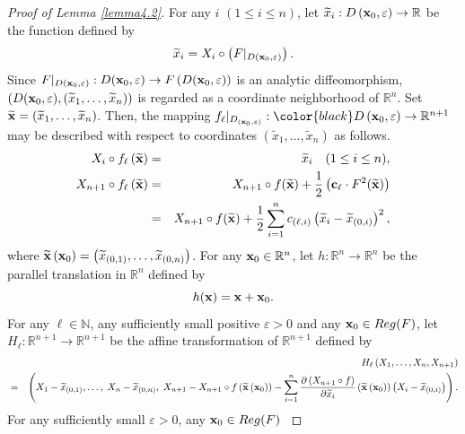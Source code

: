 \documentclass{amsart}
\theoremstyle{definition}
\theoremstyle{definition}
\theoremstyle{definition}
\newcommand{\ch}[1]{{\color{black} #1}}
\begin{document}
{{\begin{proof}[Proof of Lemma \ref{lemma4.2}]
{For any $i$ $(1\le i\le n)$, let 
$\widetilde{x}_i: D\left({\bf x}_0, \varepsilon\right)\to \mathbb{R}$ 
be the function 
defined by 
\[
\widetilde{x}_i=X_i\circ 
\left(F|_{D\left({\bf x}_0, \varepsilon\right)}\right).   
\] 
Since $F|_{D({\bf x}_0, \varepsilon)}: 
D({\bf x}_0, \varepsilon)
\to F\left(D({\bf x}_0, \varepsilon)\right)$ 
is an analytic diffeomorphism, 
$\left(D({\bf x}_0, \varepsilon), 
\left(\widetilde{x}_1, \ldots, \widetilde{x}_n\right)\right)$ is regarded 
as a coordinate neighborhood of $\mathbb{R}^n$.    
Set $\widetilde{\bf x}=\left(\widetilde{x}_1, \ldots, \widetilde{x}_n\right)$.   
Then, the mapping $f_\ell{|}_{D_{\left({\bf x}_0, \varepsilon\right)}}: 
\ch{D\left({\bf x}_0, \varepsilon\right)\to \mathbb R^{n+1}}$ 
may be described with respect to coordinates 
$\left(\widetilde{x}_1, \ldots, \widetilde{x}_n\right)$ as follows.   
\begin{eqnarray*}
X_i\circ f_\ell\left(\widetilde{\bf x}\right) 
& = & \widetilde{x}_i\quad (1\le i\le n),  \\  
X_{n+1}\circ f_\ell \left(\widetilde{\bf x}\right) 
& = & 
X_{n+1}\circ f(\widetilde{\bf x}) + 
\frac{1}{2}\left({\bf c}_\ell\cdot F^2(\widetilde{\bf x})\right)  \\ 
{ } & = & 
X_{n+1}\circ f(\widetilde{\bf x}) + 
\frac{1}{2}\sum_{i=1}^nc_{(\ell, i)}
\left(\widetilde{x}_i-\widetilde{x}_{(0, i)}\right)^2,      
\end{eqnarray*}
where $\widetilde{\bf x}\left({\bf x}_0\right)=
\left(\widetilde{x}_{(0, 1)}, \ldots, \widetilde{x}_{(0, n)}\right)$.   
For any ${\bf x}_0\in \mathbb{R}^n$, 
let $h: \mathbb{R}^n\to \mathbb{R}^n$ be the parallel translation 
in $\mathbb{R}^n$ defined by 
\[
h({\bf x})={\bf x}+{\bf x}_0.    
\]
For any $\ell\in \mathbb{N}$, any sufficiently small positive 
$\varepsilon >0$ and any ${\bf x}_0\in Reg(F)$, let 
$H_\ell: \mathbb{R}^{n+1} \to 
\mathbb{R}^{n+1}$ be the affine transformation of $\mathbb{R}^{n+1}$ 
defined by 
\begin{eqnarray*}
{ } & { } & H_\ell\left(X_1, \ldots, X_n, X_{n+1}\right)  \\ 
{ } & = &  
\left(X_1-\widetilde{x}_{(0, 1)}, \ldots,\; X_n- \widetilde{x}_{(0,n)}, 
\; X_{n+1}- X_{n+1}\circ 
f\left(\widetilde{\bf x}\left({\bf x}_0\right)\right)  
- \sum_{i=1}^n\frac{\partial \left(X_{n+1}\circ f\right)}{\partial \widetilde{x}_i}
\left(\widetilde{\bf x}\left({\bf x}_0\right)\right)
\left(X_i- \widetilde{x}_{(0,i)}\right)\right).     
\end{eqnarray*}
For any sufficiently small $\varepsilon>0$, any ${\bf x}_0\in Reg(F)$  
}
\end{proof}}}
\end{document}
